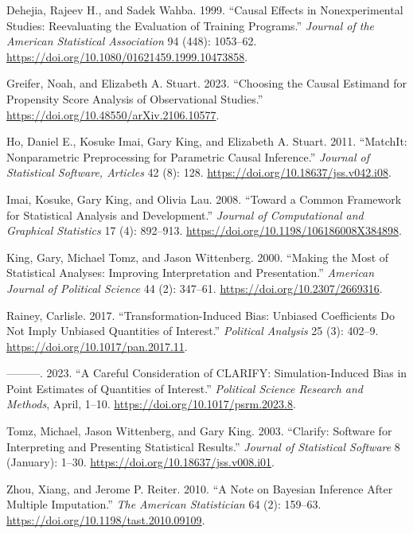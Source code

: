 \hypertarget{refs}{}
\begin{CSLReferences}{1}{0}
\leavevmode{}%
Dehejia, Rajeev H., and Sadek Wahba. 1999. {``Causal Effects in Nonexperimental Studies: Reevaluating the Evaluation of Training Programs.''} \emph{Journal of the American Statistical Association} 94 (448): 1053--62. \url{https://doi.org/10.1080/01621459.1999.10473858}.

\leavevmode{}%
Greifer, Noah, and Elizabeth A. Stuart. 2023. {``Choosing the Causal Estimand for Propensity Score Analysis of Observational Studies.''} \url{https://doi.org/10.48550/arXiv.2106.10577}.

\leavevmode{}%
Ho, Daniel E., Kosuke Imai, Gary King, and Elizabeth A. Stuart. 2011. {``MatchIt: Nonparametric Preprocessing for Parametric Causal Inference.''} \emph{Journal of Statistical Software, Articles} 42 (8): 128. \url{https://doi.org/10.18637/jss.v042.i08}.

\leavevmode{}%
Imai, Kosuke, Gary King, and Olivia Lau. 2008. {``Toward a Common Framework for Statistical Analysis and Development.''} \emph{Journal of Computational and Graphical Statistics} 17 (4): 892--913. \url{https://doi.org/10.1198/106186008X384898}.

\leavevmode{}%
King, Gary, Michael Tomz, and Jason Wittenberg. 2000. {``Making the Most of Statistical Analyses: Improving Interpretation and Presentation.''} \emph{American Journal of Political Science} 44 (2): 347--61. \url{https://doi.org/10.2307/2669316}.

\leavevmode{}%
Rainey, Carlisle. 2017. {``Transformation-Induced Bias: Unbiased Coefficients Do Not Imply Unbiased Quantities of Interest.''} \emph{Political Analysis} 25 (3): 402--9. \url{https://doi.org/10.1017/pan.2017.11}.

\leavevmode{}%
---------. 2023. {``A Careful Consideration of {CLARIFY}: Simulation-Induced Bias in Point Estimates of Quantities of Interest.''} \emph{Political Science Research and Methods}, April, 1--10. \url{https://doi.org/10.1017/psrm.2023.8}.

\leavevmode{}%
Tomz, Michael, Jason Wittenberg, and Gary King. 2003. {``Clarify: Software for Interpreting and Presenting Statistical Results.''} \emph{Journal of Statistical Software} 8 (January): 1--30. \url{https://doi.org/10.18637/jss.v008.i01}.

\leavevmode{}%
Zhou, Xiang, and Jerome P. Reiter. 2010. {``A Note on Bayesian Inference After Multiple Imputation.''} \emph{The American Statistician} 64 (2): 159--63. \url{https://doi.org/10.1198/tast.2010.09109}.

\end{CSLReferences}

